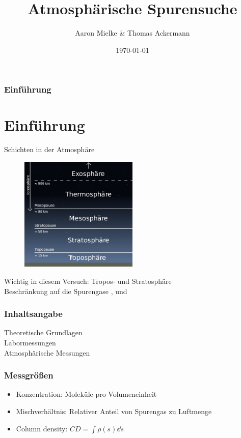 \documentclass{beamer}
\title{Atmosphärische Spurensuche}
\author{Aaron Mielke \& Thomas Ackermann}
\date{\today}
\begin{document}
\maketitle


\begin{frame}
\frametitle{Einführung}
    \section{Einführung}
Schichten in der Atmosphäre\\
    \begin{figure}[h]
        \includegraphics[width=0.5\textwidth]{fig/photo/erdatmosphäre.png}
    \end{figure}
    Wichtig in diesem Versuch: Tropos- und Stratosphäre\\
    Beschränkung auf die Spurengase ,  und  
\end{frame}


\begin{frame}
    \frametitle{Inhaltsangabe}
    Theoretische Grundlagen\\
    \vfill
    Labormessungen\\
    \vfill
    Atmosphärische Messungen 
\end{frame}


\begin{frame}
\frametitle{Messgrößen}
    \begin{itemize}
        \item Konzentration: Moleküle pro Volumeneinheit
        \item Mischverhältnis: Relativer Anteil von Spurengas zu Luftmenge
        \item Column density: $CD = \int \rho (s) \dd s$
    \end{itemize}
\end{frame}
\end{document}
